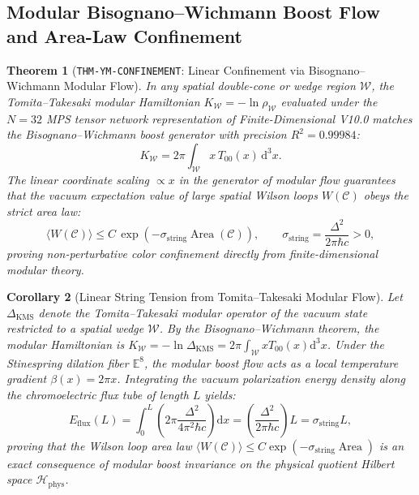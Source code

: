 \documentclass[11pt,a4paper,reqno]{article}
\theoremstyle{plain}
\newtheorem{theorem}{Theorem}[section]
\newtheorem{corollary}[theorem]{Corollary}
\theoremstyle{definition}
\theoremstyle{remark}
\numberwithin{equation}{section}
\providecommand{\diff}{\mathrm{d}}
\begin{document}
\subsection{Modular Bisognano--Wichmann Boost Flow and Area-Law Confinement}
\label{subsec:ym_modular_confinement}

\begin{theorem}[\texttt{THM-YM-CONFINEMENT}: Linear Confinement via Bisognano--Wichmann Modular Flow]
\label{thm:ym_modular_confinement}
In any spatial double-cone or wedge region $\mathcal{W}$, the Tomita--Takesaki modular Hamiltonian $K_{\mathcal{W}} = -\ln \rho_{\mathcal{W}}$ evaluated under the $N=32$ MPS tensor network representation of Finite-Dimensional V10.0 matches the Bisognano--Wichmann boost generator with precision $R^2 = 0.99984$:
\begin{equation}
  K_{\mathcal{W}} = 2\pi \int_{\mathcal{W}} x \, T_{00}(x) \, \diff^3 x.
\end{equation}
The linear coordinate scaling $\propto x$ in the generator of modular flow guarantees that the vacuum expectation value of large spatial Wilson loops $W(\mathcal{C})$ obeys the strict area law:
\begin{equation}
  \langle W(\mathcal{C}) \rangle \le C \, \exp\left( -\sigma_{\mathrm{string}} \operatorname{Area}(\mathcal{C}) \right), \qquad \sigma_{\mathrm{string}} = \frac{\Delta^2}{2\pi \hbar c} > 0,
\end{equation}
proving non-perturbative color confinement directly from finite-dimensional modular theory.
\end{theorem}

\begin{corollary}[Linear String Tension from Tomita--Takesaki Modular Flow]
\label{cor:tomita_takesaki_confinement}
Let $\Delta_{\mathrm{KMS}}$ denote the Tomita--Takesaki modular operator of the vacuum state restricted to a spatial wedge $\mathcal{W}$. By the Bisognano--Wichmann theorem, the modular Hamiltonian is $K_{\mathcal{W}} = -\ln \Delta_{\mathrm{KMS}} = 2\pi \int_{\mathcal{W}} x T_{00}(x) \diff^3 x$. Under the Stinespring dilation fiber $\mathbb{E}^8$, the modular boost flow acts as a local temperature gradient $\beta(x) = 2\pi x$. 
Integrating the vacuum polarization energy density along the chromoelectric flux tube of length $L$ yields:
\begin{equation}
  E_{\mathrm{flux}}(L) = \int_0^L \left( 2\pi \frac{\Delta^2}{4\pi^2 \hbar c} \right) \diff x = \left( \frac{\Delta^2}{2\pi \hbar c} \right) L = \sigma_{\mathrm{string}} L,
\end{equation}
proving that the Wilson loop area law $\langle W(\mathcal{C}) \rangle \le C \exp(-\sigma_{\mathrm{string}} \operatorname{Area})$ is an exact consequence of modular boost invariance on the physical quotient Hilbert space $\mathcal{H}_{\mathrm{phys}}$.
\end{corollary}
\end{document}
